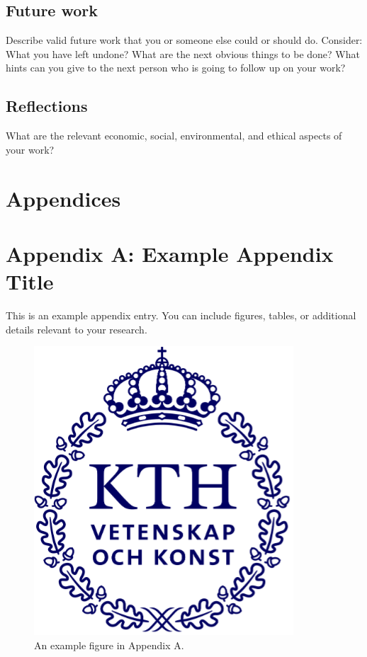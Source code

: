 \documentclass[a4paper,10pt,twocolumn]{article}
\numberwithin{figure}{section}
\numberwithin{table}{section}
\begin{document}
\subsection{Future work}
Describe valid future work that you or someone else could or should do.
Consider: What you have left undone? What are the next obvious things to be done? What hints
can you give to the next person who is going to follow up on your work?

\subsection{Reflections}
What are the relevant economic, social, environmental, and ethical aspects of your work?







\nocite{*}


% 




\newpage
\onecolumn
\appendix  %
{} %
\section*{Appendices} %
\renewcommand{\thesubsection}{\Alph{subsection}} %

\section{Appendix A: Example Appendix Title}
\label{appendix:A}
This is an example appendix entry. You can include figures, tables, or additional details relevant to your research.

\begin{figure}[htbp]
    \centering
    \includegraphics[width=0.4\linewidth]{kthLogga.png}  %
    \caption{An example figure in Appendix A.}
    \label{fig:appendixA}  
\end{figure}
\end{document}

